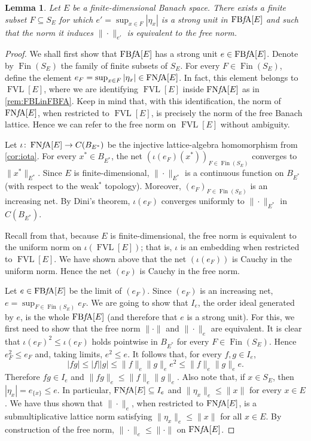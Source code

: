 \documentclass{memo-l}
\newtheorem{lem}[theorem]{Lemma}
\theoremstyle{definition}
\theoremstyle{remark}
\numberwithin{section}{chapter}
\numberwithin{equation}{chapter}
\newcommand{\FNFA}[1]{\operatorname{FN{\it f}\!A}[#1]}
\newcommand{\FBFA}[1]{\operatorname{FB{\it f}\!A}[#1]}
\newcommand{\FVLv}[1]{\operatorname{FVL}[#1]}
\DeclareMathOperator{\Fin}{Fin}
\begin{document}
\begin{lem}\label{lem:finite_prelim1}
    Let $E$ be a finite-dimensional Banach space. There exists a
    finite subset $F\subseteq S_E$ for which $e'=\sup_{x \in F}|\eta
    _x|$ is a strong unit in $\FBFA E$ and
    such that the norm it induces $\|{\cdot }\|_{e'}$ is equivalent to
    the free norm.
\end{lem}
\begin{proof}
    We shall first show that $\FBFA E$ has a strong unit $e \in \FBFA
    E$. Denote by $\Fin (S_{E})$ the family of finite subsets of
    $S_E$. For every $F \in \Fin (S_{E})$, define the element
    $e_F=\sup_{x \in F}|\eta _x| \in \FNFA E$. In fact, this element
    belongs to $\FVLv E$, where we are identifying $\FVLv E$ inside
    $\FNFA E$ as in \cref{rem:FBLinFBFA}. Keep in mind that, with this
    identification, the norm of $\FNFA E$, when restricted to $\FVLv
    E$, is precisely the norm of the free Banach lattice. Hence
    we can refer to the free norm on $\FVLv E$ without ambiguity.

    Let $\iota \colon \FNFA E\to C(B_{E^{*}})$
    be the injective lattice-algebra homomorphism from
    \cref{cor:iota}. For every $x^{*}\in B_{E^{*}}$, the net
    $(\iota (e_F)(x^{*}))_{F \in \Fin(S_E)}$ converges to $\|x^{*}\|_{E^{*}}$. Since $E$ is
    finite-dimensional, $\|{\cdot }\|_{E^{*}}$ is a continuous
    function on $B_{E^{*}}$ (with respect to the weak$^*$ topology). Moreover, $(e_F)_{F \in \Fin (S_{E})}$
    is an increasing net. By Dini's theorem, $\iota (e_F)$ converges
    uniformly to $\|{\cdot }\|_{E^{*}}$ in $C(B_{E^*})$.

    Recall from \cite[Section 9.1]{oikhberg_etal2022} that, because
    $E$ is finite-dimensional, the free norm is equivalent to the
    uniform norm on $\iota (\FVLv E)$; that is, $\iota $ is an
    embedding when restricted to $\FVLv E$. We have shown above that the net
    $(\iota (e_F))$ is Cauchy in the uniform norm. Hence the net
    $(e_F)$ is Cauchy in the free norm.

    Let $e \in \FBFA E$ be the limit of $(e_F)$. Since $(e_F)$ is an
    increasing net, $e=\sup_{F \in \Fin(S_E)}e_F$. We are
    going to show that $I_e$, the order ideal generated by $e$, is the whole
    $\FBFA E$ (and therefore that $e$ is a strong unit). For this, we
    first need to show that the free norm $\|{\cdot }\|$ and $\|{\cdot
    }\|_e$ are equivalent. It is
    clear that $\iota (e_F)^2\le \iota (e_F)$ holds pointwise in
    $B_{E^{*}}$ for every $F \in \Fin(S_E)$. Hence $e_F^2\le e_F$ and,
    taking limits, $e^2\le
    e$. It follows that, for every $f,g \in I_e$,
    \[
    |fg|\le |f| |g|\le \|f\|_e \|g\|_e e^2\le \|f\|_e \|g\|_e e.
    \]
    Therefore $fg \in I_e$ and $\|fg\|_e\le \|f\|_e \|g\|_e$. Also
    note that, if $x \in S_{E}$, then $|\eta _x|= e_{\{x\}}\le e$.
    In particular, $\FNFA E \subseteq I_e$ and $\|\eta _x\|_e\le
    \|x\|$ for every $x \in E$. We have thus shown that $\|{\cdot
    }\|_e$, when restricted to $\FNFA E$, is a submultiplicative
    lattice norm satisfying $\|\eta _x\|_e\le \|x\|$ for all $x \in
    E$. By construction of the free norm, $\|{\cdot }\|_e\le \|{\cdot
    }\|$ on $\FNFA E$.


\end{proof}
\end{document}
